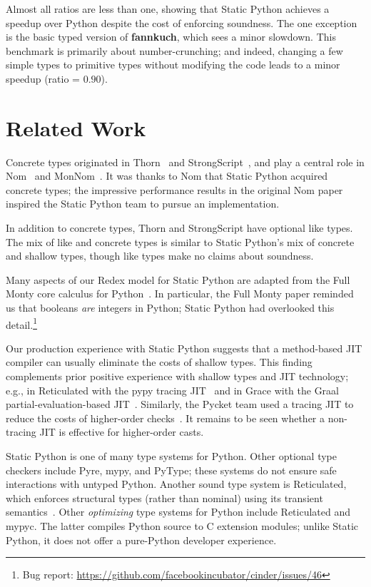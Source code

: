 \documentclass[english,cleveref,submission]{programming}
\newcommand{\SP}{Static Python}
\newcommand{\bmname}[1]{\textbf{#1}}
\begin{document}
Almost all ratios are less than one, showing that \SP{} achieves a speedup over
Python despite the cost of enforcing soundness.
The one exception is the basic typed version of \bmname{fannkuch}, which sees a minor
slowdown.
This benchmark is primarily about number-crunching; and indeed, changing a few simple
types to primitive types without modifying the code leads to a minor speedup (ratio = $0.90$).


\section{Related Work}
\label{s:related}

Concrete types originated in Thorn~\cite{bloom,wnlov-popl-2010}
and StrongScript~\cite{rzv-ecoop-2015},
and play a central role in Nom~\cite{mt-oopsla-2017} and MonNom~\cite{mt-oopsla-2021}.
It was thanks to Nom that \SP{} acquired concrete types; the impressive performance results
in the original Nom paper inspired the \SP{} team to pursue an implementation.

In addition to concrete types, Thorn and StrongScript have optional like types.
The mix of like and concrete types is similar to \SP{}'s mix of concrete and shallow
types, though like types make no claims about soundness.

Many aspects of our Redex model for \SP{} are adapted from the Full Monty core calculus
for Python~\cite{pmmwplck-oopsla-2013}.
In particular, the Full Monty paper reminded us that booleans \emph{are} integers in Python;
\SP{} had overlooked this detail.\footnote{Bug report: \url{https://github.com/facebookincubator/cinder/issues/46}}

Our production experience with \SP{} suggests that a method-based JIT compiler can
usually eliminate the costs of shallow types.
This finding complements prior positive experience with shallow types and JIT
technology; e.g., in Reticulated with the pypy tracing JIT~\cite{vsc-dls-2019}
and in Grace with the Graal partial-evaluation-based JIT~\cite{rmhn-ecoop-2019,grmhn-vmil-2019}.
Similarly, the Pycket team used a tracing JIT to reduce the costs of higher-order
checks~\cite{bbst-oopsla-2017}.
It remains to be seen whether a non-tracing JIT is effective for higher-order
casts.

\SP{} is one of many type systems for Python.
Other optional type checkers include Pyre, mypy, and PyType;
these systems do not ensure safe interactions with untyped Python.
Another sound type system is Reticulated,
which enforces structural types (rather than nominal) using its transient
semantics~\cite{vss-popl-2017,v-thesis-2019}.
Other \emph{optimizing} type systems for Python
include Reticulated and mypyc.
The latter compiles Python source to C extension modules; unlike \SP{},
it does not offer a pure-Python developer experience.
\end{document}

